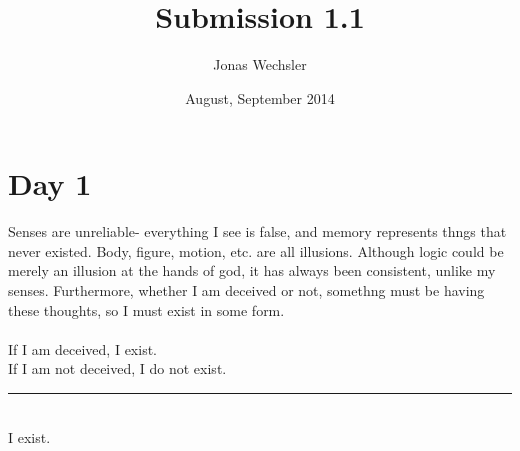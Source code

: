 \documentclass{article}
\title{Submission 1.1}
\author{Jonas Wechsler}
\date{August, September 2014}
\newcommand{\thf}{\rule{\textwidth}{.4pt}}
\begin{document}
	\maketitle

	\section{Day 1}
	Senses are unreliable- everything I see is false, and memory represents thngs that never existed. Body, figure, motion, etc. are all illusions. Although logic could be merely an illusion at the hands of god, it has always been consistent, unlike my senses. Furthermore, whether I am deceived or not, somethng must be having these thoughts, so I must exist in some form.\\\\

	If I am deceived, I exist.\\
	If I am not deceived, I do not exist.\\
	\thf \\
	I exist.
\end{document}
